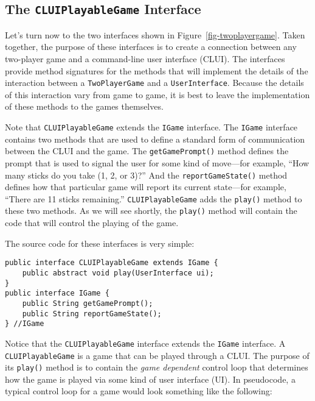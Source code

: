\subsection{The {\tt CLUIPlayableGame} Interface}

Let's turn now to the two interfaces shown in
Figure~\ref{fig-twoplayergame}.  Taken together, the purpose of these
interfaces is to create a connection between any two-player game and a
command-line user interface (CLUI).  The interfaces provide method
signatures for the methods that will implement the details of the
interaction between a {\tt TwoPlayerGame} and a {\tt UserInterface}.
Because the details of this interaction vary from game to game, it is
best to leave the implementation of these methods to the games
themselves.

Note that {\tt CLUIPlayableGame} extends the {\tt IGame} interface.
The {\tt IGame} interface contains two methods that are used to define
a standard form of communication between the CLUI and the game.  The
{\tt getGamePrompt()} method defines the prompt that is used to signal
the user for some kind of move---for example, ``How many sticks do you
take (1, 2, or 3)?''  And the {\tt reportGameState()} method defines
how that particular game will report its current state---for example,
``There are 11 sticks remaining.''  {\tt CLUIPlayableGame} adds the
{\tt play()} method to these two methods. As we will see shortly, the
{\tt play()} method will contain the code that will control the
playing of the game.

\noindent The source code for these interfaces is very simple:

\begin{jjjlisting}
\begin{lstlisting}
public interface CLUIPlayableGame extends IGame {
    public abstract void play(UserInterface ui);
}
public interface IGame {
    public String getGamePrompt();
    public String reportGameState();
} //IGame
\end{lstlisting}
\end{jjjlisting}

\noindent Notice that the {\tt CLUIPlayableGame} interface extends the
{\tt IGame} interface. A {\tt CLUIPlayableGame} is a game that can be
played through a CLUI. The purpose of its {\tt play()} method is to
contain the {\em game dependent} control loop that determines how the
game is played via some kind of user interface (UI).  In pseudocode, a
typical control loop for a game would look something like the
following:

